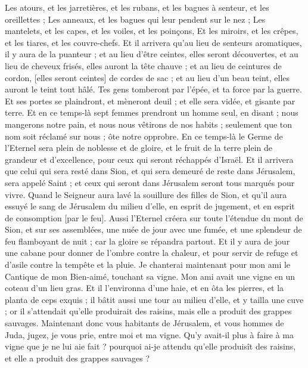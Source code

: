 \begin{multicols}{2}
Les atours, et les jarretières, et les rubans, et les bagues à senteur, et les oreillettes ;
Les anneaux, et les bagues qui leur pendent sur le nez ;
Les mantelets, et les capes, et les voiles, et les poinçons,
Et les miroirs, et les crêpes, et les tiares, et les couvre-chefs.
Et il arrivera qu'au lieu de senteurs aromatiques, il y aura de la puanteur ; et au lieu d'être ceintes, elles seront découvertes, et au lieu de cheveux frisés, elles auront la tête chauve ; et au lieu de ceintures de cordon, [elles seront ceintes] de cordes de sac ; et au lieu d'un beau teint, elles auront le teint tout hâlé.
Tes gens tomberont par l'épée, et ta force par la guerre.
Et ses portes se plaindront, et mèneront deuil ; et elle sera vidée, et gisante par terre.
\VerseOne{}Et en ce temps-là sept femmes prendront un homme seul, en disant ; nous mangerons notre pain, et nous nous vêtirons de nos habits ; seulement que ton nom soit réclamé sur nous ; ôte notre opprobre.
En ce temps-là le Germe de l'Eternel sera plein de noblesse et de gloire, et le fruit de la terre plein de grandeur et d'excellence, pour ceux qui seront réchappés d'Israël.
Et il arrivera que celui qui sera resté dans Sion, et qui sera demeuré de reste dans Jérusalem, sera appelé Saint ; et ceux qui seront dans Jérusalem seront tous marqués pour vivre.
Quand le Seigneur aura lavé la souillure des filles de Sion, et qu'il aura essuyé le sang de Jérusalem du milieu d'elle, en esprit de jugement, et en esprit de consomption [par le feu].
Aussi l'Eternel créera sur toute l'étendue du mont de Sion, et sur ses assemblées, une nuée de jour avec une fumée, et une splendeur de feu flamboyant de nuit ; car la gloire se répandra partout.
Et il y aura de jour une cabane pour donner de l'ombre contre la chaleur, et pour servir de refuge et d'asile contre la tempête et la pluie.
\VerseOne{}Je chanterai maintenant pour mon ami le Cantique de mon Bien-aimé, touchant sa vigne. Mon ami avait une vigne en un coteau d'un lieu gras.
Et il l'environna d'une haie, et en ôta les pierres, et la planta de ceps exquis ; il bâtit aussi une tour au milieu d'elle, et y tailla une cuve ; or il s'attendait qu'elle produirait des raisins, mais elle a produit des grappes sauvages.
Maintenant donc vous habitants de Jérusalem, et vous hommes de Juda, jugez, je vous prie, entre moi et ma vigne.
Qu'y avait-il plus à faire à ma vigne que je ne lui aie fait ? pourquoi ai-je attendu qu'elle produisît des raisins, et elle a produit des grappes sauvages ?

\end{multicols}
